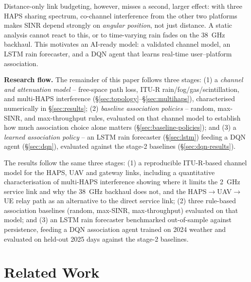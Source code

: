 \documentclass[]{ieeeaccess}
\begin{document}
Distance-only link budgeting, however, misses a second, larger effect: with three HAPS sharing spectrum, co-channel interference from the other two platforms makes SINR depend strongly on \emph{angular position}, not just distance. A static analysis cannot react to this, or to time-varying rain fades on the 38~GHz backhaul. This motivates an AI-ready model: a validated channel model, an LSTM rain forecaster, and a DQN agent that learns real-time user--platform association.

\textbf{Research flow.} The remainder of this paper follows three stages: (1) a \emph{channel and attenuation model} -- free-space path loss, ITU-R rain/fog/gas/scintillation, and multi-HAPS interference (\S\ref{sec:topology}--\S\ref{sec:multihaps}), characterised numerically in \S\ref{sec:results}; (2) \emph{baseline association policies} -- random, max-SINR, and max-throughput rules, evaluated on that channel model to establish how much association choice alone matters (\S\ref{sec:baseline-policies}); and (3) a \emph{learned association policy} -- an LSTM rain forecaster (\S\ref{sec:lstm}) feeding a DQN agent (\S\ref{sec:dqn}), evaluated against the stage-2 baselines (\S\ref{sec:dqn-results}).

The results follow the same three stages: (1) a reproducible ITU-R-based channel model for the HAPS, UAV and gateway links, including a quantitative characterisation of multi-HAPS interference showing where it limits the 2~GHz service link and why the 38~GHz backhaul does not, and the HAPS$\to$UAV$\to$UE relay path as an alternative to the direct service link; (2) three rule-based association baselines (random, max-SINR, max-throughput) evaluated on that model; and (3) an LSTM rain forecaster benchmarked out-of-sample against persistence, feeding a DQN association agent trained on 2024 weather and evaluated on held-out 2025 days against the stage-2 baselines.

\section{Related Work}
\label{sec:related-work}
\end{document}
